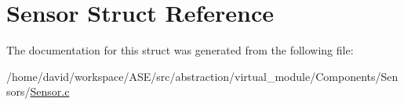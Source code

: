\hypertarget{structSensor}{
\section{Sensor Struct Reference}
\label{structSensor}
}


The documentation for this struct was generated from the following file:\begin{CompactItemize}
\item 
/home/david/workspace/ASE/src/abstraction/virtual\_\-module/Components/Sensors/\hyperlink{Sensor_8c}{Sensor.c}\end{CompactItemize}
